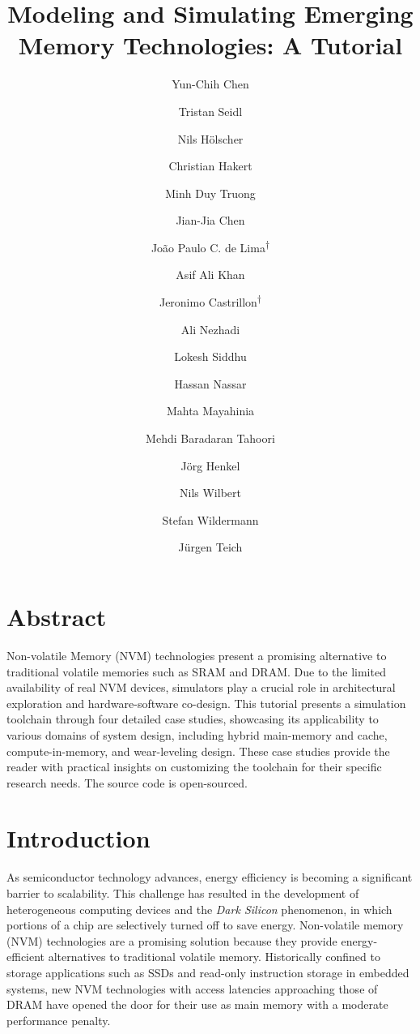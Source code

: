 \documentclass[manuscript,screen]{acmart}
\author{Yun-Chih Chen}
\author{Tristan Seidl}
\author{Nils Hölscher}
\author{Christian Hakert}
\author{Minh Duy Truong }
\author{Jian-Jia Chen}
\affiliation{
  \institution{TU Dortmund University}
  \city{Dortmund}
  \country{Germany}
}
\author{João Paulo C. de Lima\textsuperscript{$\dagger$}}
\author{Asif Ali Khan}
\author{Jeronimo Castrillon\textsuperscript{$\dagger$}}
\affiliation{
  \institution{Technische Universität Dresden, ScaDS.AI\textsuperscript{$\dagger$}}
  \city{Dresden}
  \country{Germany}
}
\author{Ali Nezhadi}
\author{Lokesh Siddhu}
\author{Hassan Nassar}
\author{Mahta Mayahinia}
\author{Mehdi Baradaran Tahoori}
\author{Jörg Henkel}
\affiliation{
  \institution{Karlsruhe Institute of Technology (KIT)}
  \city{Karlsruhe}
  \country{Germany}
}
\author{Nils Wilbert}
\author{Stefan Wildermann}
\author{Jürgen Teich}
\affiliation{
  \institution{Friedrich-Alexander-Universität Erlangen-Nürnberg}
  \city{Erlangen}
  \country{Germany}
}
\begin{document}
\title{Modeling and Simulating Emerging Memory Technologies: A Tutorial}
\maketitle
\renewcommand{\shortauthors}{Y. Chen et al.}

\section*{Abstract}
Non-volatile Memory (NVM) technologies present a promising alternative to traditional volatile memories such as SRAM and DRAM. Due to the limited availability of real NVM devices, simulators play a crucial role in architectural exploration and hardware-software co-design. This tutorial presents a simulation toolchain through four detailed case studies, showcasing its applicability to various domains of system design, including hybrid main-memory and cache, compute-in-memory, and wear-leveling design. These case studies provide the reader with practical insights on customizing the toolchain for their specific research needs. The source code is open-sourced.



\section{Introduction}\label{sec:Introduction}
As semiconductor technology advances, energy efficiency is becoming a significant barrier to scalability.
This challenge has resulted in the development of heterogeneous computing devices and the \textit{Dark Silicon} phenomenon, in which portions of a chip are selectively turned off to save energy.
Non-volatile memory (NVM) technologies are a promising solution because they provide energy-efficient alternatives to traditional volatile memory.
Historically confined to storage applications such as SSDs and read-only instruction storage in embedded systems, new NVM technologies with access latencies approaching those of DRAM \cite{pcm:2024, 10145822} have opened the door for their use as main memory with a moderate performance penalty.
\end{document}
